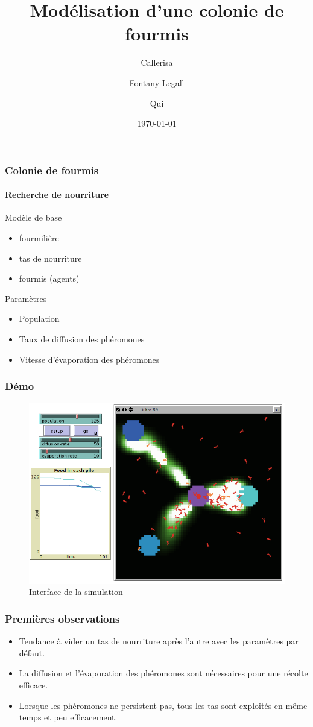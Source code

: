 \documentclass[11pt]{beamer}
\author{Callerisa \and Fontany-Legall \and Qui}
\title{Modélisation d'une colonie de fourmis}
\institute{Université de Nice}
\date{\today}
\begin{document}
\begin{frame}

\titlepage
\end{frame}

\begin{frame}
\frametitle{Colonie de fourmis}
\framesubtitle{Recherche de nourriture}
\begin{block}{Modèle de base}
\begin{itemize}
\item fourmilière
\item tas de nourriture
\item fourmis (agents)
\end{itemize}
\end{block}
\begin{block}{Paramètres}
\begin{itemize}
\item Population
\item Taux de diffusion des phéromones
\item Vitesse d'évaporation des phéromones
\end{itemize}
\end{block}
\end{frame}

\begin{frame}
\frametitle{Démo}
\begin{figure}
\includegraphics[scale=0.3]{Capture2.png}
\caption{Interface de la simulation}
\end{figure}
\end{frame}

\begin{frame}
\frametitle{Premières observations}
\begin{itemize}
\item Tendance à vider un tas de nourriture après l'autre avec les paramètres par défaut.
\item La diffusion et l'évaporation des phéromones sont nécessaires pour une récolte efficace.
\item Lorsque les phéromones ne persistent pas, tous les tas sont exploités en même temps et peu efficacement.
\end{itemize}
\end{frame}
\end{document}
